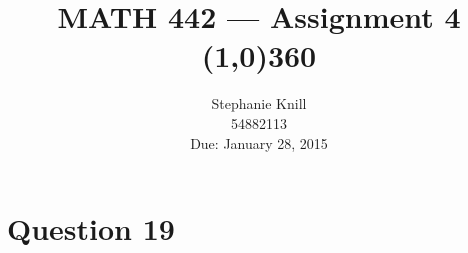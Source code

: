 \documentclass[11pt, oneside]{article}   	%
\begin{document}
\title{MATH 442 --- Assignment 4 \\
\line(1,0){360} \\              %
}
\author{
Stephanie Knill \\
54882113 \\
Due: January 28, 2015}

\date{}                   %
\maketitle


\thispagestyle{empty}                   %


\section*{Question 19}
\end{document}
